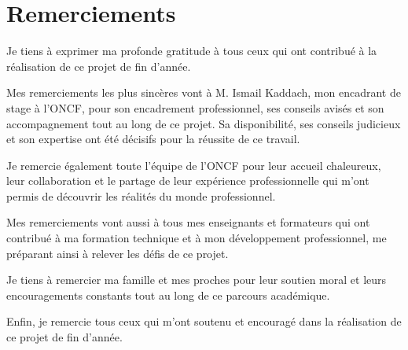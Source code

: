 \chapter*{Remerciements}

\begin{flushleft}
\large

Je tiens à exprimer ma profonde gratitude à tous ceux qui ont contribué à la réalisation de ce projet de fin d'année.

Mes remerciements les plus sincères vont à M. Ismail Kaddach, mon encadrant de stage à l'ONCF, pour son encadrement professionnel, ses conseils avisés et son accompagnement tout au long de ce projet. Sa disponibilité, ses conseils judicieux et son expertise ont été décisifs pour la réussite de ce travail.

Je remercie également toute l'équipe de l'ONCF pour leur accueil chaleureux, leur collaboration et le partage de leur expérience professionnelle qui m'ont permis de découvrir les réalités du monde professionnel.

Mes remerciements vont aussi à tous mes enseignants et formateurs qui ont contribué à ma formation technique et à mon développement professionnel, me préparant ainsi à relever les défis de ce projet.

Je tiens à remercier ma famille et mes proches pour leur soutien moral et leurs encouragements constants tout au long de ce parcours académique.

Enfin, je remercie tous ceux qui m'ont soutenu et encouragé dans la réalisation de ce projet de fin d'année.

\end{flushleft}

\vfill

\newpage